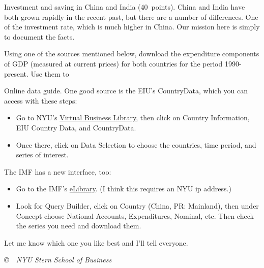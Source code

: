 \documentclass[12pt]{exam}
\begin{document}
\begin{questions}

\question Investment and saving in China and India (40~points).  
China and India have both grown rapidly in the recent past, 
but there are a number of differences.  
One of the investment rate, which is much higher in China.  
Our mission here is simply to document the facts.  

Using one of the sources mentioned below, 
download the expenditure components of GDP (measured at current prices)
for both countries for the period 1990-present.  Use them to
%


Online data guide.  One good source is the EIU's CountryData, 
which you can access with these steps:  
\begin{itemize}
\item Go to NYU's  
\href{http://library.nyu.edu/vbl/}{Virtual Business Library}, 
then click on 
Country Information, 
EIU Country Data, and   
CountryData.  
\item Once there, click on Data Selection to choose the countries,
time period, and series of interest.
\end{itemize}
The IMF has a new interface, too:   
\begin{itemize}
\item Go to the IMF's 
\href{http://elibrary-data.imf.org/}{eLibrary}.
(I think this requires an NYU ip address.)
\item Look for Query Builder, 
click on Country (China, PR: Mainland), 
then under Concept choose National Accounts, Expenditures, Nominal, etc.
Then check the series you need and download them.  
\end{itemize}  
Let me know which one you like best and I'll tell everyone.  
\end{questions}

\vfill \centerline{\it \copyright \ \number\year \
NYU Stern School of Business}
\end{document}
